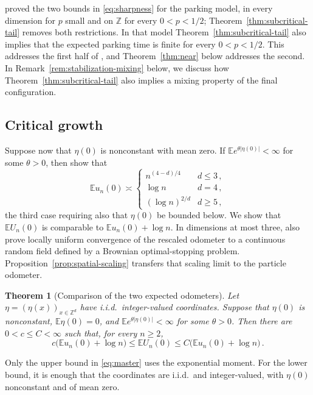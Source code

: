 \documentclass[11pt]{amsart}
\theoremstyle{plain}
\newtheorem{theorem}{Theorem}[section]
\theoremstyle{definition}
\newcommand{\Z}{\mathbb{Z}}
\newcommand{\E}{\mathbb{E}}
\begin{document}
\citet{DLS} proved the two bounds in \eqref{eq:sharpness} for the parking model, in every dimension
for $p$ small and on $\Z$ for every $0<p<1/2$; Theorem~\ref{thm:subcritical-tail}
removes both restrictions. In that model Theorem~\ref{thm:subcritical-tail} also implies that the expected parking time is finite for every $0<p<1/2$. This addresses the first half of
\citet[Open Question~2]{DGJLS}, and Theorem~\ref{thm:near} below addresses the
second. In Remark~\ref{rem:stabilization-mixing} below, we discuss how Theorem~\ref{thm:subcritical-tail} also implies a mixing property of the final
configuration.

\subsection{Critical growth}\label{ssec:results-crit}

Suppose now that $\eta(0)$ is nonconstant with mean zero. If
$\E e^{\theta|\eta(0)|}<\infty$ for some $\theta>0$, then \citet{BP} show that
\begin{equation}\label{eq:bp}
	\E u_n(0)\asymp
	\begin{cases}
		n^{(4-d)/4}&d\leq3\,,\\
		\log n&d=4\,,\\
		(\log n)^{2/d}&d\geq5\,,
	\end{cases}
\end{equation}
the third case requiring also that $\eta(0)$ be bounded below. We show that $\E U_n(0)$ is comparable to $\E u_n(0)+\log n$. In dimensions at most three, \citet{BP} also prove locally uniform convergence of the rescaled odometer to a continuous random field defined by a Brownian optimal-stopping problem. Proposition~\ref{prop:spatial-scaling} transfers that scaling limit to the particle
odometer.

\begin{theorem}[Comparison of the two expected odometers]\label{thm:master}
	Let $\eta=(\eta(x))_{x\in\Z^d}$ have i.i.d.\ integer-valued coordinates.
	Suppose that $\eta(0)$ is nonconstant, $\E\eta(0)=0$, and
	$\E e^{\theta|\eta(0)|}<\infty$ for some $\theta>0$. Then there are
	$0<c\leq C<\infty$ such that, for every $n\geq2$,
	\begin{equation}\label{eq:master}
		c\bigl(\E u_n(0)+\log n\bigr)\leq\E U_n(0)
		\leq C\bigl(\E u_n(0)+\log n\bigr)\,.
	\end{equation}
\end{theorem}

Only the upper bound in \eqref{eq:master} uses the exponential moment. For the
lower bound, it is enough that the coordinates are i.i.d.\ and integer-valued,
with $\eta(0)$ nonconstant and of mean zero.
\end{document}
